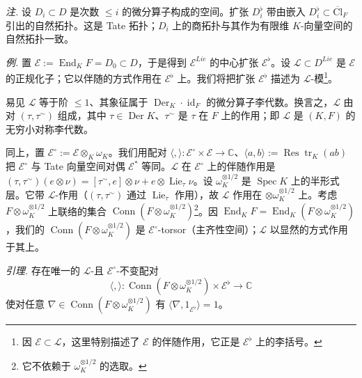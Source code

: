 \emph{注.} 设 $D_{i}\subset D$ 是次数 $\le i$ 的微分算子构成的空间。扩张 $D^{\flat}_{i}$ 带由嵌入%
$D^{\flat}_{i}\subset\overline{\mathrm{Cl}}_{F}$ 引出的自然拓扑。这是 Tate 拓扑；$D_{i}$ 上的商拓扑与其作为有限维 $K$-向量空间的自然拓扑一致。

 \emph{例.} 置 $\mathcal{E}:=\operatorname{End}_{K}F=D_{0}\subset D$，于是得到 $\mathcal{E}^{Lie}$ 的中心扩张 $\mathcal{E}^{\flat}$。设 $\mathcal{L}\subset D^{Lie}$ 是 $\mathcal{E}$ 的正规化子；它以伴随的方式作用在 $\mathcal{E}^{\flat}$ 上。我们将把扩张 $\mathcal{E}^{\flat}$ 描述为 $\mathcal{L}$-模\footnote{因 $\mathcal{E}\subset\mathcal{L}$，这里特别描述了 $\mathcal{E}$ 的伴随作用，它正是 $\mathcal{E}^{\flat}$ 上的李括号。}。

易见 $\mathcal{L}$ 等于阶 $\le1$、其象征属于 $\operatorname{Der}_{K}\cdot\operatorname{id}_{F}$ 的微分算子李代数。换言之，$\mathcal{L}$ 由对 $(\tau,\tau^{\sim})$ 组成，其中 $\tau\in\operatorname{Der}K$、$\tau^{\sim}$ 是 $\tau$ 在 $F$ 上的作用；即 $\mathcal{L}$ 是 $(K,F)$ 的无穷小对称李代数。

同上，置 $\mathcal{E}^{\circ}:=\mathcal{E}\otimes_{K}\omega_{K}$。我们用配对 $\langle,\rangle:\mathcal{E}^{\circ}\times\mathcal{E}\to\mathbb{C}$、$\langle a,b\rangle:=\operatorname{Res}\operatorname{tr}_{K}(ab)$ 把 $\mathcal{E}^{\circ}$ 与 Tate 向量空间对偶 $\mathcal{E}^{*}$ 等同。$\mathcal{L}$ 在 $\mathcal{E}^{\circ}$ 上的伴随作用是 $(\tau,\tau^{\sim})(e\otimes\nu)=[\tau^{\sim},e]\otimes\nu+e\otimes\operatorname{Lie}_{\tau}\nu$。设 $\omega_{K}^{\otimes1/2}$ 是 $\operatorname{Spec}K$ 上的半形式层。它带 $\mathcal{L}$-作用（$(\tau,\tau^{\sim})$ 通过 $\operatorname{Lie}_{\tau}$ 作用），故 $\mathcal{L}$ 作用在 $\otimes\omega_{K}^{\otimes1/2}$ 上。考虑 $F\otimes\omega_{K}^{\otimes1/2}$ 上联络的集合 $\operatorname{Conn}(F\otimes\omega_{K}^{\otimes1/2})$\footnote{它不依赖于 $\omega_{K}^{\otimes1/2}$ 的选取。}。因 $\operatorname{End}_{K}F=\operatorname{End}_{K}(F\otimes\omega_{K}^{\otimes1/2})$，我们的 $\operatorname{Conn}(F\otimes\omega_{K}^{\otimes1/2})$ 是 $\mathcal{E}^{\circ}$-torsor（主齐性空间）；$\mathcal{L}$ 以显然的方式作用于其上。

 \emph{引理.} 存在唯一的 $\mathcal{L}$-且 $\mathcal{E}^{\circ}$-不变配对
\[
\langle,\rangle:\operatorname{Conn}(F\otimes\omega_{K}^{\otimes1/2})\times\mathcal{E}^{\flat}\to\mathbb{C}
\]
使对任意 $\nabla\in\operatorname{Conn}(F\otimes\omega_{K}^{\otimes1/2})$ 有 $\langle\nabla,1_{\mathcal{E}^{\flat}}\rangle=1$。

